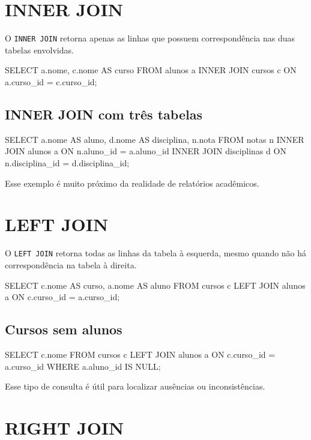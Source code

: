 \section{INNER JOIN}

O \texttt{INNER JOIN} retorna apenas as linhas que possuem correspondência nas duas tabelas envolvidas.

\begin{sqlcode}
SELECT a.nome, c.nome AS curso
FROM alunos a
INNER JOIN cursos c
    ON a.curso_id = c.curso_id;
\end{sqlcode}

\subsection{INNER JOIN com três tabelas}

\begin{sqlcode}
SELECT a.nome AS aluno,
       d.nome AS disciplina,
       n.nota
FROM notas n
INNER JOIN alunos a
    ON n.aluno_id = a.aluno_id
INNER JOIN disciplinas d
    ON n.disciplina_id = d.disciplina_id;
\end{sqlcode}

Esse exemplo é muito próximo da realidade de relatórios acadêmicos.

\section{LEFT JOIN}

O \texttt{LEFT JOIN} retorna todas as linhas da tabela à esquerda, mesmo quando não há correspondência na tabela à direita.

\begin{sqlcode}
SELECT c.nome AS curso, a.nome AS aluno
FROM cursos c
LEFT JOIN alunos a
    ON c.curso_id = a.curso_id;
\end{sqlcode}

\subsection{Cursos sem alunos}

\begin{sqlcode}
SELECT c.nome
FROM cursos c
LEFT JOIN alunos a
    ON c.curso_id = a.curso_id
WHERE a.aluno_id IS NULL;
\end{sqlcode}

Esse tipo de consulta é útil para localizar ausências ou inconsistências.

\section{RIGHT JOIN}

